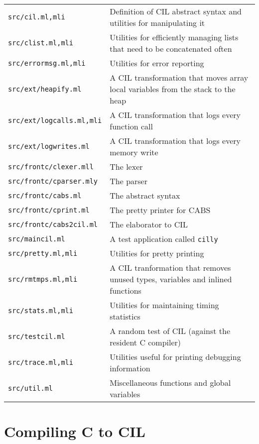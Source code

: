 \documentclass{article}
\def\t#1{{\tt #1}}
\begin{document}
\begin{tabular}{ll}
\t{src/cil.ml,mli}              & Definition of CIL abstract syntax and
                                   utilities for manipulating it\\
\t{src/clist.ml,mli}            & Utilities for efficiently managing lists
                                   that need to be concatenated often\\
\t{src/errormsg.ml,mli}         & Utilities for error reporting \\
\t{src/ext/heapify.ml}          & A CIL transformation that moves array local
                                   variables from the stack to the heap \\
\t{src/ext/logcalls.ml,mli}     & A CIL transformation that logs every
                                   function call \\
\t{src/ext/logwrites.ml}        & A CIL transformation that logs every memory
                                   write \\
\t{src/frontc/clexer.mll}       & The lexer \\
\t{src/frontc/cparser.mly}      & The parser \\
\t{src/frontc/cabs.ml}          & The abstract syntax \\
\t{src/frontc/cprint.ml}        & The pretty printer for CABS \\
\t{src/frontc/cabs2cil.ml}      & The elaborator to CIL \\
\t{src/maincil.ml}                 & A test application called \t{cilly} \\
\t{src/pretty.ml,mli}           & Utilities for pretty printing \\
\t{src/rmtmps.ml,mli}           & A CIL tranformation that removes unused
                                  types, variables and inlined functions \\
\t{src/stats.ml,mli}            & Utilities for maintaining timing statistics
\\
\t{src/testcil.ml}              & A random test of CIL (against the resident 
                                  C compiler)\\
\t{src/trace.ml,mli}            & Utilities useful for printing debugging
                                   information\\
\t{src/util.ml}                 & Miscellaneous functions and global variables
\end{tabular}


\section{Compiling C to CIL}\label{sec-cabs2cil}
\end{document}
